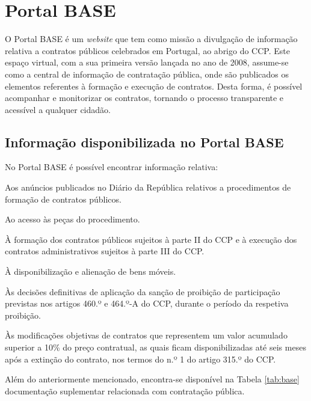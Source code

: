 \section{Portal BASE}

O Portal BASE  é um \textit{website} que tem como missão a divulgação de informação relativa a contratos públicos celebrados em Portugal, ao abrigo do CCP.
Este espaço virtual, com a sua primeira versão lançada no ano de 2008, assume-se como a central de informação de contratação pública, onde são publicados os elementos referentes à formação e execução de contratos. 
Desta forma, é possível acompanhar e monitorizar os contratos, tornando o processo transparente e acessível a qualquer cidadão. 





\subsection{Informação disponibilizada no Portal BASE}

No Portal BASE é possível encontrar informação relativa:

\begin{my_enumerate}
	\item Aos anúncios publicados no Diário da República relativos a procedimentos de formação de contratos públicos.
	\item Ao acesso às peças do procedimento.
	\item À formação dos contratos públicos sujeitos à parte II do CCP e à execução dos contratos administrativos sujeitos à parte III do CCP.
	\item À disponibilização e alienação de bens móveis.
	\item Às decisões definitivas de aplicação da sanção de proibição de participação previstas nos artigos 460.º e 464.º-A do CCP, durante o período da respetiva proibição.
	\item Às modificações objetivas de contratos que representem um valor acumulado superior a 10\% do preço contratual, as quais ficam disponibilizadas até seis meses após a extinção do contrato, nos termos do n.º 1 do artigo 315.º do CCP.
\end{my_enumerate}

Além do anteriormente mencionado, encontra-se disponível na Tabela \ref{tab:base} documentação suplementar relacionada com contratação pública.

